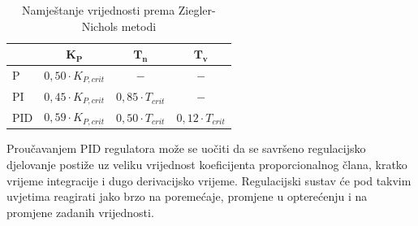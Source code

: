 \documentclass[times, utf8, diplomski]{fer}
\begin{document}
\begin{table}[htb]
\caption{Namještanje vrijednosti prema Ziegler-Nichols metodi}
\label{tbl:konstantePID}
\centering
\begin{tabular}{lccc} \toprule
& $\mathbf{K_P}$ & $\mathbf{T_n}$ & $\mathbf{T_v}$\\ \midrule
P & $0,50\cdot K_{P,crit}$ & $-$ & $-$ \\
PI & $0,45\cdot K_{P,crit}$ & $0,85\cdot T_{crit}$ & $-$ \\
PID & $0,59\cdot K_{P,crit}$ & $0,50\cdot T_{crit}$ & $0,12\cdot T_{crit}$ \\ \bottomrule
\end{tabular}
\end{table}
Proučavanjem PID regulatora može se uočiti da se savršeno regulacijsko djelovanje postiže uz veliku vrijednost koeficijenta proporcionalnog člana, kratko vrijeme integracije i dugo derivacijsko vrijeme. Regulacijski sustav će pod takvim uvjetima reagirati jako brzo na poremećaje, promjene u opterećenju i na promjene zadanih vrijednosti.
\end{document}
